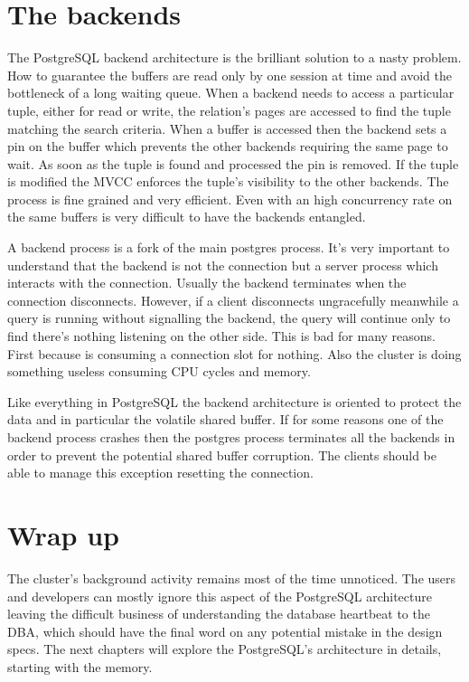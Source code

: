 \section{The backends}
The PostgreSQL backend architecture is the brilliant solution to a nasty problem. How to guarantee the 
buffers are read only by one session at time and avoid the bottleneck of a long waiting queue. When a 
backend needs to access a particular tuple, either for read or write, the relation's pages are accessed to 
find the tuple matching the search criteria. When a buffer is accessed then the backend sets a pin on the 
buffer which prevents the other backends requiring the same page to wait. As soon as the tuple is found and 
processed the pin is removed. If the tuple is modified the MVCC enforces the tuple's visibility to the other 
backends. The process is fine grained and very efficient. Even with an high concurrency rate on the same 
buffers is very difficult to have the backends entangled.\newline

A backend process is a fork of the main postgres process. It's very important to understand that the 
backend is not the connection but a server process which interacts with the connection. Usually the backend 
terminates when the connection disconnects. However, if a client disconnects ungracefully meanwhile a query 
is running without signalling the backend, the query will continue only to find there's nothing listening 
on the other side. This is bad for many reasons. First because is consuming a connection slot for nothing. 
Also the cluster is doing something useless consuming CPU cycles and memory. \newline

Like everything in PostgreSQL the backend architecture is oriented to protect the data and in particular 
the volatile shared buffer. If for some reasons one of the backend process crashes then the postgres 
process terminates all the backends in order to prevent the potential shared buffer corruption. The clients 
should be able to manage this exception resetting the connection.\newline

\section{Wrap up}
The cluster's background activity remains most of the time unnoticed. The users and developers can mostly 
ignore this aspect of the PostgreSQL architecture leaving the difficult business of understanding the 
database heartbeat to the DBA, which should have the final word on any potential mistake in the design 
specs. The next chapters will explore the PostgreSQL's architecture in details, starting with the memory.
